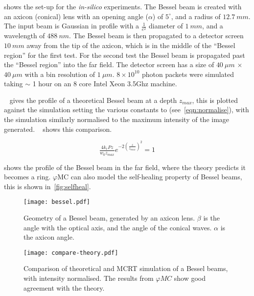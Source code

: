  shows the set-up for the \textit{in-silico} experiments.
The Bessel beam is created with an axicon (conical) lens with an opening angle ($\alpha$) of $5^{\circ}$, and a radius of $12.7~mm$.
The input beam is Gaussian in profile with a $\tfrac{1}{e^2}$ diameter of $1~mm$, and a wavelength of $488~nm$.
The Bessel beam is then propagated to a detector screen $10~mm$ away from the tip of the axicon, which is in the middle of the ``Bessel region'' for the first test.
For the second test the Bessel beam is propagated past the ``Bessel region'' into the far field.
The detector screen has a size of $40~\mu m$ $\times$ $40~\mu m$ with a bin resolution of $1~\mu m$.
$8\times 10^{10}$ photon packets were simulated taking $\sim$ 1 hour on an 8 core Intel Xeon 3.5Ghz machine.

\medskip

~ gives the profile of a theoretical Bessel beam at a depth $z_{max}$, this is plotted against the simulation setting the various constants to (see~\cref{eqn:normalise}), with the simulation similarly normalised to the maximum intensity of the image generated. ~ shows this comparison.

\begin{equation}
\tfrac{4k_rPz}{w_0z_{max}}e^{-2\left(\tfrac{z}{z_{max}}\right)^2}=1
\label{eqn:normalise}
\end{equation}


 shows the profile of the Bessel beam in the far field, where the theory predicts it becomes a ring.
$\varphi$MC can also model the self-healing property of Bessel beams, this is shown in~\cref{fig:selfheal}.

\begin{figure}[!htbp]
    \centering
    \texttt{[image: bessel.pdf]}
    \caption{Geometry of a Bessel beam, generated by an axicon lens. $\beta$ is the angle with the optical axis, and the angle of the conical waves. $\alpha$ is the axicon angle.}
    \label{fig:besselgeo}
\end{figure}


\begin{figure}[!htbp]
    \centering
    \texttt{[image: compare-theory.pdf]}
    \caption{Comparison of theoretical and MCRT simulation of a Bessel beams, with intensity normalised. The results from $\varphi MC$ show good agreement with the theory.}
    \label{fig:besselCompare}
\end{figure}

